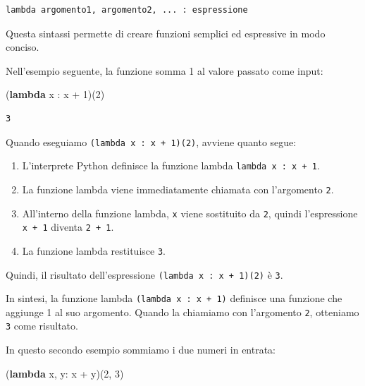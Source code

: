 \documentclass[
  letterpaper,
  krantz2]{{[}./krantz{]}}
\newenvironment{Shaded}{\begin{snugshade}}{\end{snugshade}}
\newcommand{\DecValTok}[1]{\textcolor[rgb]{0.68,0.00,0.00}{#1}}
\newcommand{\KeywordTok}[1]{\textcolor[rgb]{0.00,0.23,0.31}{\textbf{#1}}}
\newcommand{\NormalTok}[1]{\textcolor[rgb]{0.00,0.23,0.31}{#1}}
\newcommand{\OperatorTok}[1]{\textcolor[rgb]{0.37,0.37,0.37}{#1}}
\providecommand{\tightlist}{%
  \setlength{\itemsep}{0pt}\setlength{\parskip}{0pt}}\usepackage{longtable,booktabs,array}
\begin{document}
\begin{verbatim}
lambda argomento1, argomento2, ... : espressione
\end{verbatim}

Questa sintassi permette di creare funzioni semplici ed espressive in
modo conciso.

Nell'esempio seguente, la funzione somma 1 al valore passato come input:

\begin{Shaded}
\begin{Highlighting}[]
\NormalTok{(}\KeywordTok{lambda}\NormalTok{ x : x }\OperatorTok{+} \DecValTok{1}\NormalTok{)(}\DecValTok{2}\NormalTok{)}
\end{Highlighting}
\end{Shaded}

\begin{verbatim}
3
\end{verbatim}

Quando eseguiamo \texttt{(lambda\ x\ :\ x\ +\ 1)(2)}, avviene quanto
segue:

\begin{enumerate}
\def\labelenumi{\arabic{enumi}.}
\tightlist
\item
  L'interprete Python definisce la funzione lambda
  \texttt{lambda\ x\ :\ x\ +\ 1}.
\item
  La funzione lambda viene immediatamente chiamata con l'argomento
  \texttt{2}.
\item
  All'interno della funzione lambda, \texttt{x} viene sostituito da
  \texttt{2}, quindi l'espressione \texttt{x\ +\ 1} diventa
  \texttt{2\ +\ 1}.
\item
  La funzione lambda restituisce \texttt{3}.
\end{enumerate}

Quindi, il risultato dell'espressione
\texttt{(lambda\ x\ :\ x\ +\ 1)(2)} è \texttt{3}.

In sintesi, la funzione lambda \texttt{(lambda\ x\ :\ x\ +\ 1)}
definisce una funzione che aggiunge 1 al suo argomento. Quando la
chiamiamo con l'argomento \texttt{2}, otteniamo \texttt{3} come
risultato.

In questo secondo esempio sommiamo i due numeri in entrata:

\begin{Shaded}
\begin{Highlighting}[]
\NormalTok{(}\KeywordTok{lambda}\NormalTok{ x, y: x }\OperatorTok{+}\NormalTok{ y)(}\DecValTok{2}\NormalTok{, }\DecValTok{3}\NormalTok{)}
\end{Highlighting}
\end{Shaded}
\end{document}
